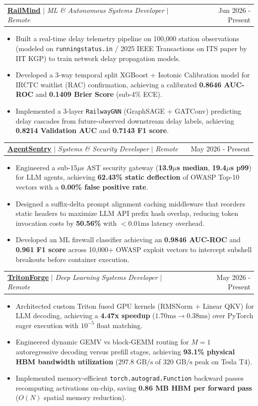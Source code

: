 \documentclass[letterpaper,9pt]{extarticle}
\makeatletter
\newcommand{\resumeItem}[1]{\item\small{{#1}}}
\newcommand{\resumeProjectHeading}[2]{
    \vspace{3pt}\item
    \begin{tabular*}{\textwidth}{l@{\extracolsep{\fill}}r}
      #1 & {\color{dark-grey}\small #2}\\
    \end{tabular*}\vspace{1.0pt}
}
\newcommand{\resumeItemListStart}{\begin{itemize}[leftmargin=*, label=\textbullet, noitemsep, topsep=0pt, parsep=0pt, partopsep=0pt]}
\newcommand{\resumeItemListEnd}{\end{itemize}}
\makeatother
\begin{document}
      \resumeProjectHeading
          {\textbf{\href{https://gaurav711-rail-mind.hf.space/}{RailMind}} $|$ \small\textit{ML \& Autonomous Systems Developer} $|$ \small\textit{Remote} ~ \href{https://github.com/Gaurav711cgu/Rail_Mind}{\faGithub}}{Jun 2026 - Present}
          \resumeItemListStart
            \resumeItem{Built a real-time delay telemetry pipeline on 100,000 station observations (modeled on \texttt{runningstatus.in} / 2025 IEEE Transactions on ITS paper by IIT KGP) to train network delay propagation models.}
            \resumeItem{Developed a 3-way temporal split XGBoost + Isotonic Calibration model for IRCTC waitlist (RAC) confirmation, achieving a calibrated \textbf{0.8646 AUC-ROC} and \textbf{0.1409 Brier Score} (sub-4\% ECE).}
            \resumeItem{Implemented a 3-layer \texttt{RailwayGNN} (GraphSAGE + GATConv) predicting delay cascades from future-observed downstream delay labels, achieving \textbf{0.8214 Validation AUC} and \textbf{0.7143 F1 score}.}
          \resumeItemListEnd

      \resumeProjectHeading
          {\textbf{\href{https://agent-sentry-blush.vercel.app/}{AgentSentry}} $|$ \small\textit{Systems \& Security Developer} $|$ \small\textit{Remote} ~ \href{https://github.com/Gaurav711cgu/AgentSentry}{\faGithub}}{May 2026 - Present}
          \resumeItemListStart
            \resumeItem{Engineered a sub-15$\mu$s AST security gateway (\textbf{13.9$\mu$s median}, \textbf{19.4$\mu$s p99}) for LLM agents, achieving \textbf{62.43\% static deflection} of OWASP Top-10 vectors with a \textbf{0.00\% false positive rate}.}
            \resumeItem{Designed a suffix-delta prompt alignment caching middleware that reorders static headers to maximize LLM API prefix hash overlap, reducing token invocation costs by \textbf{50.56\%} with $<0.01\text{ms}$ latency overhead.}
            \resumeItem{Developed an ML firewall classifier achieving an \textbf{0.9846 AUC-ROC} and \textbf{0.961 F1 score} across 10,000+ OWASP exploit vectors to intercept subshell breakouts before container execution.}
          \resumeItemListEnd

      \resumeProjectHeading
          {\textbf{\href{https://tritonforge-frontend.vercel.app/}{TritonForge}} $|$ \small\textit{Deep Learning Systems Developer} $|$ \small\textit{Remote} ~ \href{https://github.com/Gaurav711cgu/TritonForge}{\faGithub}}{May 2026 - Present}
          \resumeItemListStart
            \resumeItem{Architected custom Triton fused GPU kernels (RMSNorm + Linear QKV) for LLM decoding, achieving a \textbf{4.47x speedup} ($1.70\text{ms} \rightarrow 0.38\text{ms}$) over PyTorch eager execution with $10^{-5}$ float matching.}
            \resumeItem{Engineered dynamic GEMV vs block-GEMM routing for $M=1$ autoregressive decoding versus prefill stages, achieving \textbf{93.1\% physical HBM bandwidth utilization} ($297.8\text{ GB/s}$ of $320\text{ GB/s}$ peak on Tesla T4).}
            \resumeItem{Implemented memory-efficient \texttt{torch.autograd.Function} backward passes recomputing activations on-chip, saving \textbf{0.86 MB HBM per forward pass} ($O(N)$ spatial memory reduction).}
          \resumeItemListEnd
\end{document}
